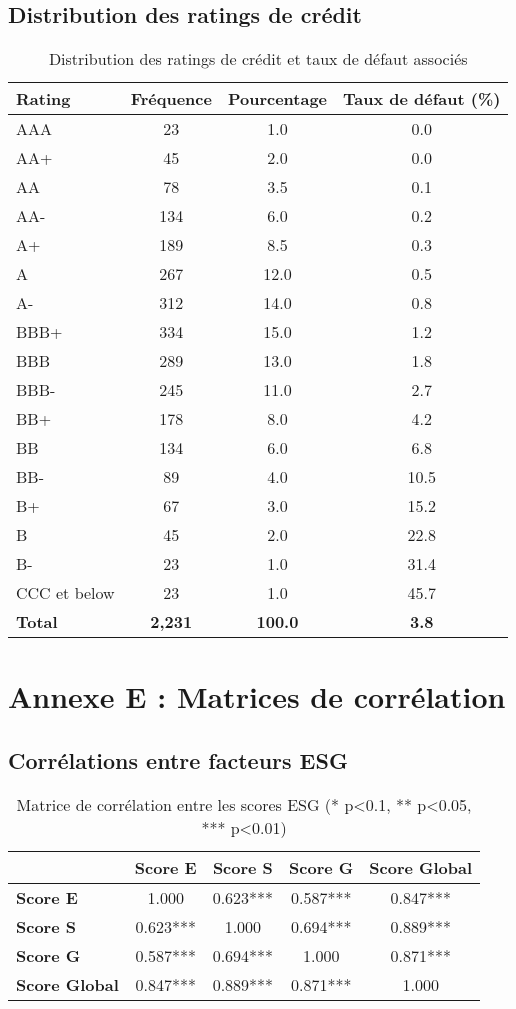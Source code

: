 \subsection{Distribution des ratings de crédit}

\begin{table}[h]
\centering
\begin{tabular}{|l|c|c|c|}
\hline
\textbf{Rating} & \textbf{Fréquence} & \textbf{Pourcentage} & \textbf{Taux de défaut (\%)} \\
\hline
AAA & 23 & 1.0 & 0.0 \\
AA+ & 45 & 2.0 & 0.0 \\
AA & 78 & 3.5 & 0.1 \\
AA- & 134 & 6.0 & 0.2 \\
A+ & 189 & 8.5 & 0.3 \\
A & 267 & 12.0 & 0.5 \\
A- & 312 & 14.0 & 0.8 \\
BBB+ & 334 & 15.0 & 1.2 \\
BBB & 289 & 13.0 & 1.8 \\
BBB- & 245 & 11.0 & 2.7 \\
BB+ & 178 & 8.0 & 4.2 \\
BB & 134 & 6.0 & 6.8 \\
BB- & 89 & 4.0 & 10.5 \\
B+ & 67 & 3.0 & 15.2 \\
B & 45 & 2.0 & 22.8 \\
B- & 23 & 1.0 & 31.4 \\
CCC et below & 23 & 1.0 & 45.7 \\
\hline
\textbf{Total} & \textbf{2,231} & \textbf{100.0} & \textbf{3.8} \\
\hline
\end{tabular}
\caption{Distribution des ratings de crédit et taux de défaut associés}
\end{table}

\section{Annexe E : Matrices de corrélation}

\subsection{Corrélations entre facteurs ESG}

\begin{table}[h]
\centering
\begin{tabular}{|l|c|c|c|c|}
\hline
& \textbf{Score E} & \textbf{Score S} & \textbf{Score G} & \textbf{Score Global} \\
\hline
\textbf{Score E} & 1.000 & 0.623*** & 0.587*** & 0.847*** \\
\textbf{Score S} & 0.623*** & 1.000 & 0.694*** & 0.889*** \\
\textbf{Score G} & 0.587*** & 0.694*** & 1.000 & 0.871*** \\
\textbf{Score Global} & 0.847*** & 0.889*** & 0.871*** & 1.000 \\
\hline
\end{tabular}
\caption{Matrice de corrélation entre les scores ESG (* p<0.1, ** p<0.05, *** p<0.01)}
\end{table}

